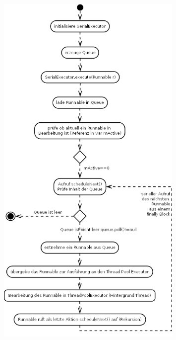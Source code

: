 \documentclass[12pt,oneside,a4paper,bibtotoc,liststotoc]{scrreprt}
\begin{document}
\begin{figure}[H]
  \begin{centering}
    \includegraphics[width=0.8\textwidth]{img/ActivitydiagrammAsyncTaskSerialExecutor.png}
    \label{ActivitydiagrammAsyncTaskSerialExecutor}
  \end{centering}
\end{figure}
\end{document}
